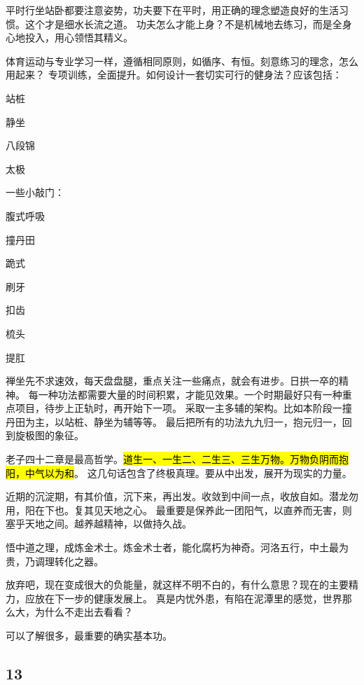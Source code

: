 平时行坐站卧都要注意姿势，功夫要下在平时，用正确的理念塑造良好的生活习惯。这个才是细水长流之道。
功夫怎么才能上身？不是机械地去练习，而是全身心地投入，用心领悟其精义。

体育运动与专业学习一样，遵循相同原则，如循序、有恒。刻意练习的理念，怎么用起来？
专项训练，全面提升。如何设计一套切实可行的健身法？应该包括：
\begin{enumbox}
\item 站桩
\item 静坐
\item 八段锦
\item 太极
\end{enumbox}

一些小敲门：
\begin{enumbox}
\item 腹式呼吸
\item 撞丹田
\item 跪式
\item 刷牙
\item 扣齿
\item 梳头
\item 提肛
\end{enumbox}

禅坐先不求速效，每天盘盘腿，重点关注一些痛点，就会有进步。日拱一卒的精神。
每一种功法都需要大量的时间积累，才能见效果。一个时期最好只有一种重点项目，待步上正轨时，再开始下一项。
采取一主多辅的架构。比如本阶段一撞丹田为主，以站桩、静坐为辅等等。
最后把所有的功法九九归一，抱元归一，回到旋极图的象征。

老子四十二章是最高哲学。\hl{道生一、一生二、二生三、三生万物。万物负阴而抱阳，中气以为和}。
这几句话包含了终极真理。要从中出发，展开为现实的力量。

近期的沉淀期，有其价值，沉下来，再出发。收敛到中间一点，收放自如。潜龙勿用，阳在下也。复其见天地之心。
最重要是保养此一团阳气，以直养而无害，则塞乎天地之间。越养越精神，以做持久战。

悟中道之理，成炼金术士。炼金术士者，能化腐朽为神奇。河洛五行，中土最为贵，乃调理转化之器。

放弃吧，现在变成很大的负能量，就这样不明不白的，有什么意思？现在的主要精力，应放在下一步的健康发展上。
真是内忧外患，有陷在泥潭里的感觉，世界那么大，为什么不走出去看看？

可以了解很多，最重要的确实基本功。

\subsection{13}

